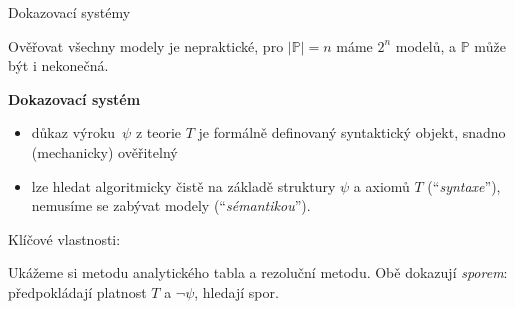 \documentclass{beamer}
\begin{document}
\begin{frame}{Dokazovací systémy}

    Ověřovat všechny modely je nepraktické, pro $|\mathbb P|=n$ máme $2^n$ modelů, a $\mathbb P$ může být i nekonečná.

    \pause

    \textbf{Dokazovací systém}
    \begin{itemize}
        \item \alert{důkaz} výroku~\( \psi \) z teorie \(T\) je formálně definovaný syntaktický objekt, snadno (mechanicky) ověřitelný
        \item lze hledat algoritmicky čistě na základě struktury \( \psi \) a axiomů \(T\) (``\emph{syntaxe}''), nemusíme se zabývat modely (``\emph{sémantikou}'').
    \end{itemize}        
    
    \pause
    Klíčové vlastnosti:

    \pause

    \pause
    Ukážeme si \alert{metodu analytického tabla} a \alert{rezoluční metodu}. Obě dokazují \emph{sporem}: předpokládají platnost $T$ a \( \neg \psi \), hledají spor.

\end{frame}
\end{document}
